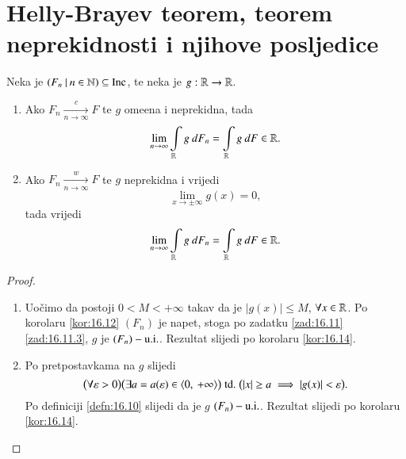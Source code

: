 
\chapter{Helly-Brayev teorem, teorem neprekidnosti i njihove posljedice}

\begin{tm}  \label{tm:18.1}
    Neka je $({F_n} \: | \: {n \in \mathbb{N}}) \subseteq \mathrm{Inc}$, te neka je $g: \mathbb{R} \to \mathbb{R}$.
    \begin{enumerate}[label=(\roman*)]
        \item   \label{tm:18.1.1}
        Ako $F_n \xrightarrow[n \to \infty]{c} F$ te $g$ ome\dj ena i neprekidna, tada
        \begin{equation*}
            \lim\limits_{n \to \infty} \int\limits_{\mathbb{R}} g \: d F_n = \int\limits_{\mathbb{R}} g \: d F \in \mathbb{R}.
        \end{equation*}
        \item   \label{tm:18.1.2}
        Ako $F_n \xrightarrow[n \to \infty]{w} F$ te $g$ neprekidna i vrijedi
        \begin{equation*}
            \lim\limits_{x \to \pm \infty} g (x) = 0,    
        \end{equation*}
        tada vrijedi
        \begin{equation*}
            \lim\limits_{n \to \infty} \int\limits_{\mathbb{R}} g \: d F_n = \int\limits_{\mathbb{R}} g \: d F \in \mathbb{R}.
        \end{equation*}
    \end{enumerate}
\end{tm}

\begin{proof}
    \begin{enumerate}[label=(\roman*)]
        \item
        Uo\v cimo da postoji $0<M<+\infty$ takav da je $|g(x)| \leq M$, $\forall x \in \mathbb{R}$.
        Po korolaru \ref{kor:16.12} $(F_n)$ je napet, stoga po zadatku \ref{zad:16.11} \ref{zad:16.11.3}, $g$ je $(F_n)-\mathrm{u.i.}$.
        Rezultat slijedi po korolaru \ref{kor:16.14}.
        \item
        Po pretpostavkama na $g$ slijedi
        \begin{equation*}
            \big(\forall \varepsilon > 0\big) \big(\exists a = a (\varepsilon) \in \langle {0}, \: {+\infty} \rangle\big) \; \mathrm{td.} \; \big(|x| \geq a \implies |g(x)| < \varepsilon \big).
        \end{equation*}
        Po definiciji \ref{defn:16.10} slijedi da je $g$ $(F_n)-\mathrm{u.i.}$.
        Rezultat slijedi po korolaru \ref{kor:16.14}.
    \end{enumerate}
\end{proof}

